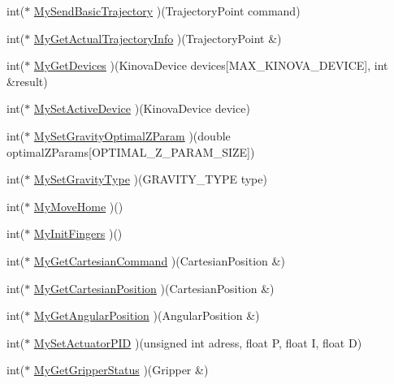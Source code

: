 \begin{DoxyCompactItemize}
\item 
int($\ast$ \hyperlink{classKinovaAPIFunctions_a46a88767727e276d53fa65021122e095}{My\+Send\+Basic\+Trajectory} )(Trajectory\+Point command)
\item 
int($\ast$ \hyperlink{classKinovaAPIFunctions_a7768fef3a414ed9910b29e07d8cec5ed}{My\+Get\+Actual\+Trajectory\+Info} )(Trajectory\+Point \&)
\item 
int($\ast$ \hyperlink{classKinovaAPIFunctions_a8d0313599ab0d35b7de11113e17b90f2}{My\+Get\+Devices} )(Kinova\+Device devices\mbox{[}M\+A\+X\+\_\+\+K\+I\+N\+O\+V\+A\+\_\+\+D\+E\+V\+I\+CE\mbox{]}, int \&result)
\item 
int($\ast$ \hyperlink{classKinovaAPIFunctions_a8903aeef945d80853520fa1870c32f9f}{My\+Set\+Active\+Device} )(Kinova\+Device device)
\item 
int($\ast$ \hyperlink{classKinovaAPIFunctions_a4eb3fda46e7ad70cfca8f70516b2afe9}{My\+Set\+Gravity\+Optimal\+Z\+Param} )(double optimal\+Z\+Params\mbox{[}O\+P\+T\+I\+M\+A\+L\+\_\+\+Z\+\_\+\+P\+A\+R\+A\+M\+\_\+\+S\+I\+ZE\mbox{]})
\item 
int($\ast$ \hyperlink{classKinovaAPIFunctions_ac359d0722318b7b30b841d6e3542d55b}{My\+Set\+Gravity\+Type} )(G\+R\+A\+V\+I\+T\+Y\+\_\+\+T\+Y\+PE type)
\item 
int($\ast$ \hyperlink{classKinovaAPIFunctions_a03c0a7192d27440be1cd544c7c6d3d06}{My\+Move\+Home} )()
\item 
int($\ast$ \hyperlink{classKinovaAPIFunctions_a0890b09eaaa7c0778e21859f77ddc542}{My\+Init\+Fingers} )()
\item 
int($\ast$ \hyperlink{classKinovaAPIFunctions_a0306932b326f70ea7bca5903ba0a14f6}{My\+Get\+Cartesian\+Command} )(Cartesian\+Position \&)
\item 
int($\ast$ \hyperlink{classKinovaAPIFunctions_ad6a222c864c2f8005093a038138660cc}{My\+Get\+Cartesian\+Position} )(Cartesian\+Position \&)
\item 
int($\ast$ \hyperlink{classKinovaAPIFunctions_aa3b25eca0b164393821019388459015a}{My\+Get\+Angular\+Position} )(Angular\+Position \&)
\item 
int($\ast$ \hyperlink{classKinovaAPIFunctions_a2431ddea38a66e953daaf467a373260d}{My\+Set\+Actuator\+P\+ID} )(unsigned int adress, float P, float I, float D)
\item 
int($\ast$ \hyperlink{classKinovaAPIFunctions_afe0b617d9f8582ff8686ed9fb37ef579}{My\+Get\+Gripper\+Status} )(Gripper \&)
\end{DoxyCompactItemize}


